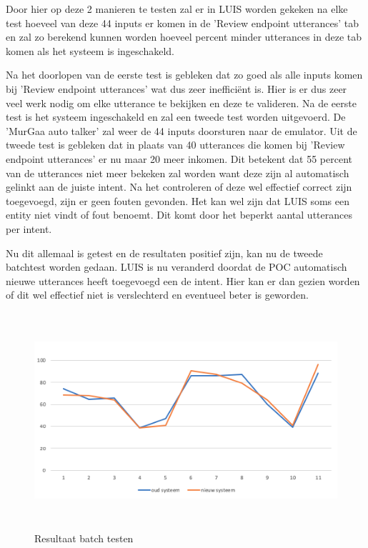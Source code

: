 Door hier op deze 2 manieren te testen zal er in LUIS worden gekeken na elke test hoeveel van deze 44 inputs er komen in de 'Review endpoint utterances' tab en zal zo berekend kunnen worden hoeveel percent minder utterances in deze tab komen als het systeem is ingeschakeld.

Na het doorlopen van de eerste test is gebleken dat zo goed als alle inputs komen bij 'Review endpoint utterances' wat dus zeer inefficiënt is. Hier is er dus zeer veel werk nodig om elke utterance te bekijken en deze te valideren. Na de eerste test is het systeem ingeschakeld en zal een tweede test worden uitgevoerd. De 'MurGaa auto talker' zal weer de 44 inputs doorsturen naar de emulator. Uit de tweede test is gebleken dat in plaats van 40 utterances die komen bij 'Review endpoint utterances' er nu maar 20 meer inkomen. Dit betekent dat 55 percent van de utterances niet meer bekeken zal worden want deze zijn al automatisch gelinkt aan de juiste intent. Na het controleren of deze wel effectief correct zijn toegevoegd, zijn er geen fouten gevonden. Het kan wel zijn dat LUIS soms een entity niet vindt of fout benoemt. Dit komt door het beperkt aantal utterances per intent.

Nu dit allemaal is getest en de resultaten positief zijn, kan nu de tweede batchtest worden gedaan. LUIS is nu veranderd doordat de POC automatisch nieuwe utterances heeft toegevoegd een de intent. Hier kan er dan gezien worden of dit wel effectief niet is verslechterd en eventueel beter is geworden.

\begin{figure}[h!]
	\centering
	\includegraphics[height=8cm]{img/grafiek.png}
	\caption{Resultaat batch testen}
	\label{fig:batchtest}
\end{figure}

